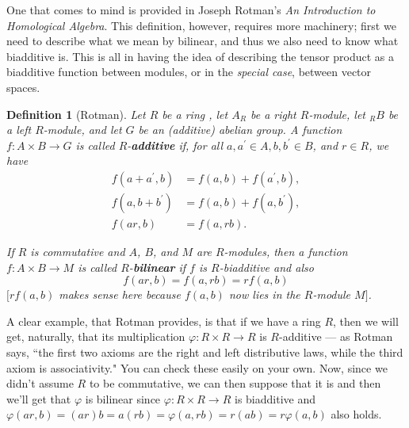 \documentclass[12pt,reqno]{amsart}
\theoremstyle{plain}
\newtheorem{defi}{Definition}
\begin{document}
One that comes to mind is provided in Joseph Rotman's \textit{An Introduction to Homological Algebra}. This definition, however, requires more machinery; first we need to describe what we mean by bilinear, and thus we also need to know what biadditive is.  This is all in having the idea of describing the tensor product as a biadditive function between modules, or in the \textit{special case}, between vector spaces. 
\begin{defi}[Rotman] Let $R$ be a ring , let $A_R$ be a right $R$-module, let $_R B$ be a left $R$-module, and let $G$ be an (additive) abelian group. A function $f \colon A \times B \to G$ is called $R$-\textbf{additive} if, for all $a, a^{\prime} \in A, b, b^{\prime} \in B$, and $r \in R$, we have 
\begin{align*}
f(a+a^{\prime}, b) &= f(a, b) + f(a^{\prime}, b), \\
f(a, b+b^{\prime}) &= f(a, b)+ f(a, b^{\prime}), \\
f(ar, b) &= f(a, rb).
\end{align*}

If $R$ is \textit{commutative} and $A$, $B$, and $M$ are $R$-modules, then a function $f \colon A \times B \to M$ is called $R$-\textbf{bilinear} if $f$ is $R$-biadditive and also
$$f (ar, b) = f(a, rb) = r f(a, b)$$
$[rf(a, b)$ makes sense here because $f(a, b)$ now lies in the $R$-module $M]$. 
\end{defi} 

A clear example, that Rotman provides,  is that if we have a ring $R$, then we will get, naturally, that its multiplication $\varphi \colon R \times R \to R$ is $R$-additive — as Rotman says, ``the first two axioms are the right and left distributive laws, while the third axiom is associativity." You can check these easily on your own.  Now, since we didn't assume $R$ to be commutative, we can then suppose that it is and then we'll get that $\varphi$ is bilinear since $\varphi \colon R \times R \to R$ is biadditive and $\varphi (ar, b) = (ar)b= a(rb) = \varphi (a, rb) = r(ab) = r \varphi (a, b)$ also holds. 
\end{document}

